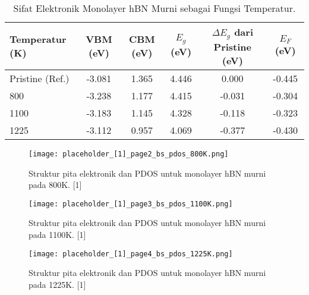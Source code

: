\begin{table}[h!]
  \centering
  \caption{Sifat Elektronik Monolayer hBN Murni sebagai Fungsi Temperatur.}
  \label{tab:hbn_murni_suhu}
  \begin{tabular}{lccccc}
    \toprule
    Temperatur (K) & VBM (eV) & CBM (eV) & $E_g$ (eV) & $\Delta E_g$ dari Pristine (eV) & $E_F$ (eV) \\
    \midrule
    Pristine (Ref.) & -3.081 &  1.365 & 4.446 &  0.000 & -0.445 \\
    800             & -3.238 &  1.177 & 4.415 & -0.031 & -0.304 \\
    1100            & -3.183 &  1.145 & 4.328 & -0.118 & -0.323 \\
    1225            & -3.112 &  0.957 & 4.069 & -0.377 & -0.430 \\
    \bottomrule
  \end{tabular}
\end{table}

\begin{figure}[h!]
    \centering
    \texttt{[image: placeholder\_[1]\_page2\_bs\_pdos\_800K.png]}
    \caption{Struktur pita elektronik dan PDOS untuk monolayer hBN murni pada 800K. [1]}
    \label{fig:hbn_pure_800K}
\end{figure}

\begin{figure}[h!]
    \centering
    \texttt{[image: placeholder\_[1]\_page3\_bs\_pdos\_1100K.png]}
    \caption{Struktur pita elektronik dan PDOS untuk monolayer hBN murni pada 1100K. [1]}
    \label{fig:hbn_pure_1100K}
\end{figure}

\begin{figure}[h!]
    \centering
    \texttt{[image: placeholder\_[1]\_page4\_bs\_pdos\_1225K.png]}
    \caption{Struktur pita elektronik dan PDOS untuk monolayer hBN murni pada 1225K. [1]}
    \label{fig:hbn_pure_1225K}
\end{figure}

